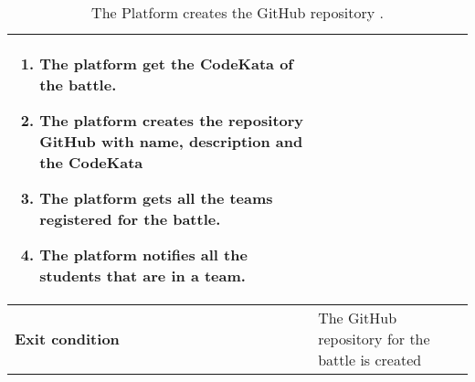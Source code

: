 \begin{enumerate}[label=\textbf{UC\arabic*}:,leftmargin=1.3cm]
\begin{table}[H]
\begin{tabular}{|l|p{11.9cm}|}
\begin{enumerate}[label=\arabic*.]
                              \item The platform get the CodeKata of the battle.
                              \item The platform creates the repository GitHub with name, description and the CodeKata
                              \item The platform gets all the teams registered for the battle.
                              \item The platform notifies all the students that are in a team.
                        \end{enumerate} \\\hline
                        \textbf{Exit condition}  & The GitHub repository for the battle is created                                   \\\hline
                  \end{tabular}
                  \caption{The Platform creates the GitHub repository   .}
                  \label{table:Battle registration deadline}
            \end{table}


\end{enumerate}
